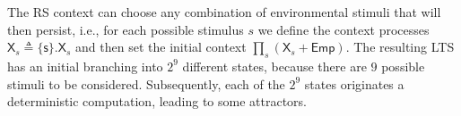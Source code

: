 The RS context can choose any combination of environmental stimuli that will then persist, i.e., for each possible stimulus $s$ we define the context processes $\mathsf{X}_s \triangleq \{\mathsf{s}\}.\mathsf{X}_s$
%
and then set the initial context $\prod_s (\mathsf{X}_s + \mathsf{Emp})$.
The resulting LTS has an initial branching into $2^9$ different states, because there are $9$ possible stimuli to be considered. Subsequently, each of the $2^9$ states originates a deterministic computation, leading to some attractors. 

